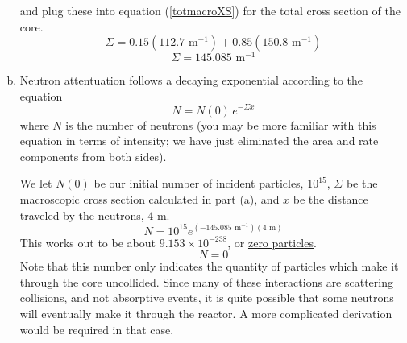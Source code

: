 \begin{enumerate}[a)]
and plug these into equation (\ref{totmacroXS}) for the total cross section of the core.
$$ \Sigma = 0.15(112.7\text{ m}^{-1}) + 0.85(150.8\text{ m}^{-1})
 $$
$$\boxed{ \Sigma = 145.085\text{ m}^{-1} }$$

\item 

Neutron attentuation follows a decaying exponential according to the equation
$$ N = N(0) \, e^{-\Sigma x} $$
where $N$ is the number of neutrons (you may be more familiar with this equation in terms of intensity; we have just eliminated the area and rate components from both sides).

We let $N(0)$ be our initial number of incident particles, $10^{15}$, $\Sigma$ be the macroscopic cross section calculated in part (a), and $x$ be the distance traveled by the neutrons, 4 m.  
$$ N = 10^{15} e^{(-145.085\text{ m}^{-1})(4\text{ m})} $$
This works out to be about $9.153\times10^{-238}$, or \underline{zero particles}.
$$ N = 0 $$
Note that this number only indicates the quantity of particles which make it through the core uncollided. Since many of these interactions are scattering collisions, and not absorptive events, it is quite possible that some neutrons will eventually make it through the reactor. A more complicated derivation would be required in that case.
\end{enumerate}

